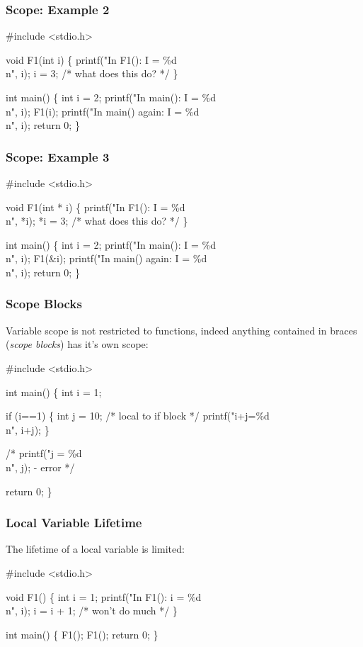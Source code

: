 \documentclass[table]{beamer}
\newif\ifschigh\schighfalse
\newcommand{\kw}[1]{\ifschigh\textcolor{red}{#1}\else\textcolor{keyword}{#1}\fi}
\newcommand{\kt}[1]{\ifschigh\textcolor{red}{#1}\else\textcolor{ctext}{#1}\fi}
\newcommand{\kc}[1]{\ifschigh\textcolor{red}{#1}\else\textcolor{comment}{#1}\fi}
\newcounter{sckll}
\newcommand{\kr}{\setcounter{sckll}{1}}
\newcommand{\kl}{}
\begin{document}
\begin{frame}[fragile]
\frametitle{Scope: Example 2}
\vspace{-0.1in}
\begin{semiverbatim}
\kr\kl\kw{\#include} \kt{<stdio.h>}
\kl
\kl\kw{void} F1(\kw{int} i)
\kl\{
\kl   printf(\kt{"In F1(): I = \%d\\n"}, i);
\kl   i = 3;  \kc{/* what does this do? */}
\kl\}
\kl
\kl\kw{int} main()
\kl\{
\kl   \kw{int} i = 2;
\kl   printf(\kt{"In main(): I = \%d\\n"}, i);
\kl   F1(i);
\kl   printf(\kt{"In main() again: I = \%d\\n"}, i);
\kl   \kw{return} 0;
\kl\}
\end{semiverbatim}
\end{frame}

\begin{frame}[fragile]
\frametitle{Scope: Example 3}
\vspace{-0.1in}
\begin{semiverbatim}
\kr\kl\kw{\#include} \kt{<stdio.h>}
\kl
\kl\kw{void} F1(\kw{int} * i)
\kl\{
\kl   printf(\kt{"In F1(): I = \%d\\n"}, *i);
\kl   *i = 3;  \kc{/* what does this do? */}
\kl\}
\kl
\kl\kw{int} main()
\kl\{
\kl   \kw{int} i = 2;
\kl   printf(\kt{"In main(): I = \%d\\n"}, i);
\kl   F1(\&i);
\kl   printf(\kt{"In main() again: I = \%d\\n"}, i);
\kl   \kw{return} 0;
\kl\}
\end{semiverbatim}
\end{frame}

\begin{frame}[fragile]
\frametitle{Scope Blocks}
Variable scope is not restricted to functions, indeed anything contained in braces (\emph{scope blocks}) has it's own scope:
\vspace{-0.1in}
\begin{semiverbatim}
\small
\kr\kl\kw{\#include} \kt{<stdio.h>}
\kl
\kl\kw{int} main()
\kl\{
\kl   \kw{int} i = 1;
\kl
\kl   \kw{if} (i==1)
\kl   \{
\kl      \kw{int} j = 10; \kc{/* local to if block */}
\kl      printf(\kt{"i+j=\%d\\n"}, i+j);
\kl   \}
\kl
\kl   \kc{/* printf("j = \%d\\n", j); - error */}
\kl
\kl   \kw{return} 0;
\kl\}
\end{semiverbatim}
\end{frame}

\begin{frame}[fragile]
\frametitle{Local Variable Lifetime}
The lifetime of a local variable is limited:
\begin{semiverbatim}
\kw{\#include} \kt{<stdio.h>}

\kw{void} F1()
\{
   \kw{int} i = 1;
   printf(\kt{"In F1(): i = \%d\\n"}, i);
   i = i + 1; \kc{/* won't do much */}
\}

\kw{int} main()
\{
   F1();
   F1();
   \kw{return} 0;
\}
\end{semiverbatim}
\end{frame}
\end{document}
